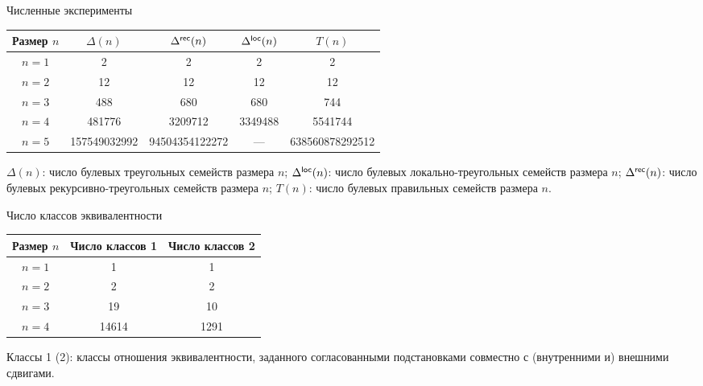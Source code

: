 \begin{frame}{Численные эксперименты}
    \begin{center}
        \begin{tabular}{|c|c|c|c|c|}
            \hline
            Размер $n$  & $\Delta(n)$ & $\Delta^{\mathsf{rec}}(n)$ & $\Delta^{\mathsf{loc}}(n)$ & $T(n)$ \\
            \hline
            $n = 1$ & 2 & 2 & 2 & 2 \\
            \hline
            $n = 2$ & 12 & 12 & 12 & 12 \\
            \hline
            $n = 3$ & 488 & 680 & 680 & 744\\
            \hline
            $n = 4$ & 481776 & 3209712 & 3349488 & 5541744 \\
            \hline
            $n = 5$ & 157549032992 & 94504354122272 & --- & 638560878292512 \\
            \hline
        \end{tabular}


        $\Delta(n)$: число булевых треугольных семейств размера $n$;
        $\Delta^{\mathsf{loc}}(n)$: число булевых локально-треугольных семейств размера $n$;
        $\Delta^{\mathsf{rec}}(n)$: число булевых рекурсивно-треугольных семейств размера $n$;
        $T(n)$: число булевых правильных семейств размера $n$.
    \end{center}
\end{frame}


\begin{frame}{Число классов эквивалентности}
    \begin{center}
        \begin{tabular}{|c|c|c|}
            \hline
            Размер $n$ & Число классов 1 & Число классов 2 \\
            \hline
            $n = 1$ & 1 & 1 \\
            \hline
            $n = 2$ & 2 & 2 \\
            \hline
            $n = 3$ & 19 & 10 \\
            \hline
            $n = 4$ & 14614 & 1291 \\
            \hline
        \end{tabular}

        Классы 1 (2): классы отношения эквивалентности, заданного согласованными подстановками совместно с (внутренними и) внешними сдвигами.
    \end{center}
\end{frame}


